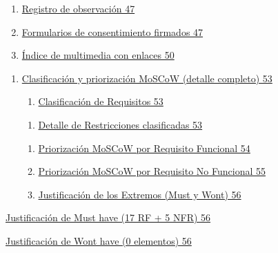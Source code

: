 \documentclass[
]{article}
\begin{document}
\begin{enumerate}
\def\labelenumi{\arabic{enumi}.}
\setcounter{enumi}{4}
\item
  \hyperref[registro-de-observaciuxf3n]{Registro de observación 47}
\item
  \hyperref[formularios-de-consentimiento-firmados]{Formularios de
  consentimiento firmados 47}
\item
  \hyperref[uxedndice-de-multimedia-con-enlaces]{Índice de multimedia
  con enlaces 50}
\end{enumerate}

\begin{enumerate}
\def\labelenumi{\Alph{enumi}.}
\setcounter{enumi}{2}
\item
  \hyperref[clasificaciuxf3n-y-priorizaciuxf3n-moscow-detalle-completo]{Clasificación
  y priorización MoSCoW (detalle completo) 53}

  \begin{enumerate}
  \def\labelenumii{\arabic{enumii}.}
  \item
    \hyperref[_bookmark101]{Clasificación de Requisitos 53}
  \end{enumerate}

  \begin{enumerate}
  \def\labelenumii{\arabic{enumii}.}
  \setcounter{enumii}{1}
  \item
    \hyperref[_bookmark102]{Detalle de Restricciones clasificadas 53}
  \end{enumerate}

  \begin{enumerate}
  \def\labelenumii{\arabic{enumii}.}
  \setcounter{enumii}{2}
  \item
    \hyperref[_bookmark103]{Priorización MoSCoW por Requisito Funcional
    54}
  \item
    \hyperref[priorizaciuxf3n-moscow-por-requisito-no-funcional]{Priorización
    MoSCoW por Requisito No Funcional 55}
  \item
    \hyperref[_bookmark107]{Justificación de los Extremos (Must y
    Won\textquotesingle t) 56}
  \end{enumerate}
\end{enumerate}

\hyperref[_bookmark108]{Justificación de Must have (17 RF + 5 NFR) 56}

\hyperref[justificaciuxf3n-de-wont-have-0-elementos]{Justificación de
Won\textquotesingle t have (0 elementos) 56}
\end{document}
